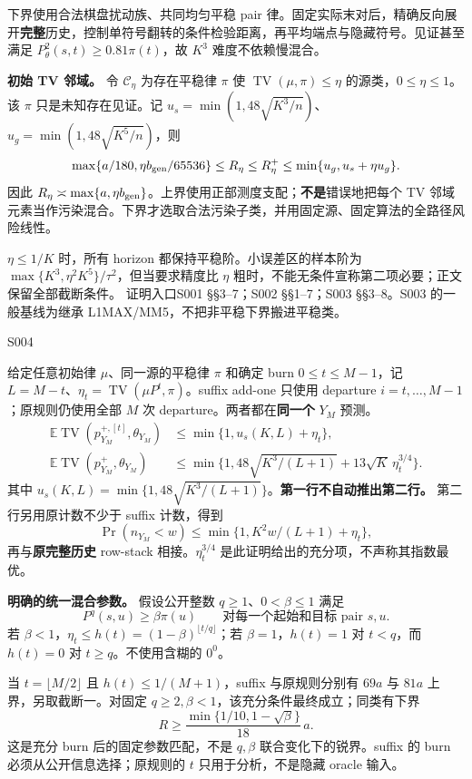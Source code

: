 \documentclass[11pt,a4paper]{article}
\renewcommand{\emph}[1]{\textbf{#1}}
\newcommand{\TV}{\operatorname{TV}}
\newcommand{\E}{\mathbb E}
\newcommand{\head}[2]{\begin{center}{\large\sffamily\color{ink}#1}\end{center}\vspace{-4pt}{\LARGE\bfseries #2}\par\vspace{5pt}}
\newcommand{\entry}[1]{\vfill\noindent\small\textcolor{ink}{证明入口}\quad#1\normalsize}
\begin{document}
下界使用合法棋盘扰动族、共同均匀平稳 pair 律。固定实际末对后，精确反向展开\textbf{完整}历史，控制单符号翻转的条件检验距离，再平均端点与隐藏符号。见证甚至满足 $P_\theta^2(s,t)\ge0.81\pi(t)$，故 $K^3$ 难度不依赖慢混合。

\textbf{初始 TV 邻域。} 令 $\mathcal C_\eta$ 为存在平稳律 $\pi$ 使 $\TV(\mu,\pi)\le\eta$ 的源类，$0\le\eta\le1$。该 $\pi$ 只是未知存在见证。记 $u_s=\min(1,48\sqrt{K^3/n})$、$u_g=\min(1,48\sqrt{K^5/n})$，则
\[
 \max\{a/180,\eta b_{\rm gen}/65536\}
 \le R_\eta\le R^+_\eta\le\min\{u_g,u_s+\eta u_g\}.
\]
因此 $R_\eta\asymp\max\{a,\eta b_{\rm gen}\}$。上界使用正部测度支配；\textbf{不是}错误地把每个 TV 邻域元素当作污染混合。下界才选取合法污染子类，并用固定源、固定算法的全路径风险线性。

$\eta\le1/K$ 时，所有 horizon 都保持平稳阶。小误差区的样本阶为 $\max\{K^3,\eta^2K^5\}/\tau^2$，但当要求精度比 $\eta$ 粗时，不能无条件宣称第二项必要；正文保留全部截断条件。
\entry{S001 §§3--7；S002 §§1--7；S003 §§3--8。S003 的一般基线为继承 L1MAX/MM5，不把非平稳下界搬进平稳类。}
\newpage
\head{S004}{混合能洗掉初始化\quad{}原规则需单独证明}
给定任意初始律 $\mu$、同一源的平稳律 $\pi$ 和确定 burn $0\le t\le M-1$，记 $L=M-t$、$\eta_t=\TV(\mu P^t,\pi)$。suffix add-one 只使用 departure $i=t,\ldots,M-1$；原规则仍使用全部 $M$ 次 departure。两者都在\textbf{同一个} $Y_M$ 预测。
\begin{align*}
 \E\TV(p^{+,[t]}_{Y_M},\theta_{Y_M})
 &\le\min\{1,u_s(K,L)+\eta_t\},\\
 \E\TV(p^+_{Y_M},\theta_{Y_M})
 &\le\min\{1,48\sqrt{K^3/(L+1)}+13\sqrt K\,\eta_t^{3/4}\}.
\end{align*}
其中 $u_s(K,L)=\min\{1,48\sqrt{K^3/(L+1)}\}$。\textbf{第一行不自动推出第二行。} 第二行另用原计数不少于 suffix 计数，得到
\[
 \Pr(n_{Y_M}<w)\le\min\{1,K^2w/(L+1)+\eta_t\},
\]
再与\emph{原完整历史} row-stack 相接。$\eta_t^{3/4}$ 是此证明给出的充分项，不声称其指数最优。

\textbf{明确的统一混合参数。} 假设公开整数 $q\ge1$、$0<\beta\le1$ 满足
\[
 P^q(s,u)\ge\beta\pi(u)\qquad\text{对每一个起始和目标 pair }s,u.
\]
若 $\beta<1$，$\eta_t\le h(t)=(1-\beta)^{\lfloor t/q\rfloor}$；若 $\beta=1$，$h(t)=1$ 对 $t<q$，而 $h(t)=0$ 对 $t\ge q$。不使用含糊的 $0^0$。

当 $t=\lfloor M/2\rfloor$ 且 $h(t)\le1/(M+1)$，suffix 与原规则分别有 $69a$ 与 $81a$ 上界，另取截断一。对固定 $q\ge2,\beta<1$，该充分条件最终成立；同类有下界
\[
 R\ge\frac{\min\{1/10,1-\sqrt\beta\}}{18}\,a.
\]
这是充分 burn 后的固定参数匹配，不是 $q,\beta$ 联合变化下的锐界。suffix 的 burn 必须从公开信息选择；原规则的 $t$ 只用于分析，不是隐藏 oracle 输入。
\end{document}
